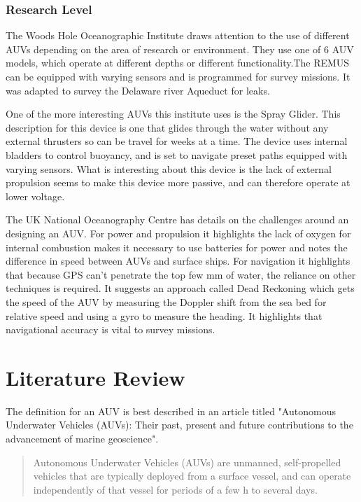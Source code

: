 \documentclass[11pt,a4paper,titlepage]{report}
\begin{document}
	\subsection*{Research Level}
	The Woods Hole Oceanographic Institute\cite{WOODS_HOLE} draws attention to the use of different AUVs depending on the area of research or environment. They use one of 6 AUV models, which operate at different depths or different functionality.The REMUS\cite{WOODS_HOLE_REMUS} can be equipped with varying sensors and is programmed for survey missions. It was adapted to survey the Delaware river Aqueduct for leaks. 
	
	One of the more interesting AUVs this institute uses is the Spray Glider\cite{WOODS_HOLE_SPRAY_GLIDER}. This description for this device is one that glides through the water without any external thrusters so can be travel for weeks at a time. The device uses internal bladders to control buoyancy, and is set to navigate preset paths equipped with varying sensors. What is interesting about this device is the lack of external propulsion seems to make this device more passive, and can therefore operate at lower voltage.
	
	The UK National Oceanography Centre has details on the challenges around an designing an AUV\cite{NATIONAL_OCEANOGRAPHIC_AUTOSUBS}. For power and propulsion it highlights the lack of oxygen for internal combustion makes it necessary to use batteries for power and notes the difference in speed between AUVs and surface ships. For navigation it highlights that because GPS can't penetrate the top few mm of water, the reliance on other techniques is required. It suggests an approach called Dead Reckoning which gets the speed of the AUV by measuring the Doppler shift from the sea bed for relative speed and using a gyro to measure the heading. It highlights that navigational accuracy is vital to survey missions. 
	
	\chapter*{Literature Review}
	The definition for an AUV is best described in an article titled "Autonomous Underwater Vehicles (AUVs): Their past, present and future contributions to the advancement of marine geoscience". 
	
	\begin{quote}
		Autonomous Underwater Vehicles (AUVs) are unmanned, self-propelled vehicles that are typically deployed from a surface vessel, and can operate independently of that vessel for periods of a few h to several days.\cite{AUV_PPF}
	\end{quote}
	
\end{document}
